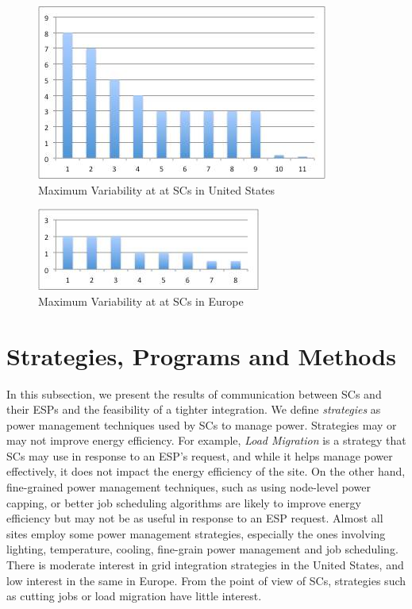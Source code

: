 \documentclass{llncs}
\begin{document}
\begin{figure}
\begin{center}
\includegraphics[scale=0.8]{figs/USVar.jpg}
\caption{Maximum Variability at at SCs in United States}
\label{fig:USvar}
\end{center}
\end{figure}

\begin{figure}
\begin{center}
\includegraphics[scale=0.8]{figs/EUVar.jpg}
\caption{Maximum Variability at at SCs in Europe}
\label{fig:EUvar}
\end{center}
\end{figure}


\section{Strategies, Programs and Methods}
\label{spm}
In this subsection, we present the results of communication between SCs and their ESPs and the feasibility of a tighter integration. We define \emph{strategies} as power management techniques used by SCs to manage power. Strategies may or may not improve energy efficiency. For example, \emph{Load Migration} is a strategy that SCs may use in response to an ESP's request, and while it helps manage power effectively, it does not impact the energy efficiency of the site. On the other hand, fine-grained power management techniques, such as using node-level power capping, or better job scheduling algorithms are likely to improve energy efficiency but may not be as useful in response to an ESP request. Almost all sites employ some power management strategies, especially the ones involving lighting, temperature, cooling, fine-grain power management and job scheduling. There is moderate interest in grid integration strategies in the United States, and low interest in the same in Europe. From the point of view of SCs, strategies such as cutting jobs or load migration have little interest. 
\end{document}
